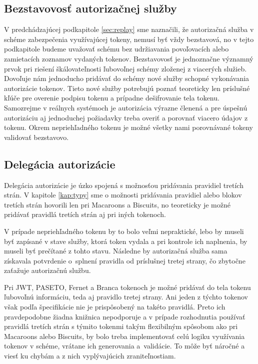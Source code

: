 \subsection{Bezstavovosť autorizačnej služby}

V predchádzajúcej podkapitole \ref{sec:replay} sme naznačili, že autorizačná služba v schéme zabezpečenia využívajúcej tokeny, nemusí byť vždy bezstavová, no v tejto podkapitole budeme uvažovať schému bez udržiavania povoľovacích alebo zamietacích zoznamov vydaných tokenov. Bezstavovosť je jednoznačne významný prvok pri riešení škálovateľnosti ľubovoľnej schémy zloženej z viacerých služieb. Dovoľuje nám jednoducho pridávať do schémy nové služby schopné vykonávania autorizácie tokenov. Tieto nové služby potrebujú poznať teoreticky len príslušné kľúče pre overenie podpisu tokenu a prípadne dešifrovanie tela tokenu. Samozrejme v reálnych systémoch je autorizácia výrazne členená a pre úspešnú autorizáciu aj jednoduchej požiadavky treba overiť a porovnať viacero údajov z tokenu. Okrem nepriehľadného tokenu je možné všetky nami porovnávané tokeny validovať bezstavovo.

\subsection{Delegácia autorizácie}

Delegácia autorizácie je úzko spojená s možnosťou pridávania pravidiel tretích strán. V kapitole \ref{kap:typy} sme o možnosti pridávania pravidiel alebo blokov tretích strán hovorili len pri Macaroons a Biscuits, no teoreticky je možné pridávať pravidlá tretích strán aj pri iných tokenoch. 

V prípade nepriehľadného tokenu by to bolo veľmi nepraktické, lebo by museli byť zapísané v stave služby, ktorá token vydala a pri kontrole ich naplnenia, by museli byť prečítané z tohto stavu. Následne by autorizačná služba sama získavala potvrdenie o~splnení pravidla od príslušnej tretej strany, čo zbytočne zaťažuje autorizačnú službu.

Pri JWT, PASETO, Fernet a Branca tokenoch je možné pridávať do tela tokenu ľubovoľnú informáciu, teda aj pravidlo tretej strany. Ani jeden z týchto tokenov však podľa špecifikácie nie je prispôsobený na takéto pravidlá. Preto ich pravdepodobne žiadna knižnica nepodporuje a v prípade rozhodnutia používať pravidlá tretích strán s týmito tokenmi takým flexibilným spôsobom ako pri Macaroons alebo Biscuits, by bolo treba implementovať celú logiku využívania tokenov v schéme, vrátane ich generovania a~validácie. To môže byť náročné a viesť ku chybám a z nich vyplývajúcich zraniteľnostiam.

